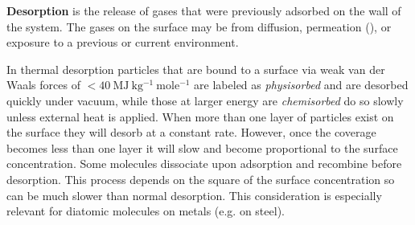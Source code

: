 \begin{table}
\centering
{}
\caption{Outgassing rates of , , , and  from 316L stainless steel after various treatments.  Significant
reductions from bakeouts can be seen.  Before treatment each samble was subjected to a two-hour degreasing with perchlorethylene vapor at
$125^{\circ}\mathrm{C}$, followed by a one-hour ultrasonic washing at $55^{\circ}\mathrm{C}$, and finally were rinsed with clean water and
dried.  Data is taken from .}
\label{tab:electron_lifetime_model_outgassing_treatment_rates}
\end{table}

\textbf{Desorption} is the release of gases that were previously adsorbed on the wall of the system.  The gases on the surface may be from
diffusion, permeation (), or exposure to a previous or current
environment.

In thermal desorption particles that are bound to a surface via weak van der Waals forces of
$< 40\ \mathrm{MJ\ kg^{-1}\ mole^{-1}}$ are labeled
as \textit{physisorbed} and are desorbed quickly under vacuum, while those at larger energy are \textit{chemisorbed} do so slowly unless
external heat is applied.  When more than one layer of particles exist on the surface they will desorb at a constant rate.  However, once
the coverage becomes less than one layer it will slow and become proportional to the surface concentration.  Some molecules
dissociate upon adsorption and recombine before desorption.  This process depends on the square of the
surface concentration so can be much slower than normal desorption.  This consideration is especially relevant for diatomic molecules on
metals (e.g.  on steel).

